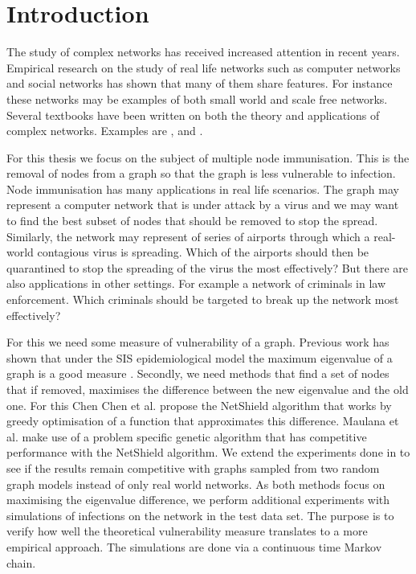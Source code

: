 \documentclass[11pt]{article}
\theoremstyle{definition}
\begin{document}
\cleardoublepage

\section{Introduction}

The study of complex networks has received increased attention in recent years. Empirical research on the study of real life networks such as computer networks and social networks has shown that many of them share features. For instance these networks may be examples of both small world and scale free networks. Several textbooks have been written on both the theory and applications of complex networks. Examples are \cite{van2016random}, \cite{Draief} and \cite{thai2011handbook}.

For this thesis we focus on the subject of multiple node immunisation. This is the removal of nodes from a graph so that the graph is less vulnerable to infection. Node immunisation has many applications in real life scenarios. The graph may represent a computer network that is under attack by a virus and we may want to find the best subset of nodes that should be removed to stop the spread. Similarly, the network may represent of series of airports through which a real-world contagious virus is spreading. Which of the airports should then be quarantined to stop the spreading of the virus the most effectively? But there are also applications in other settings. For example a network of criminals in law enforcement. Which criminals should be targeted to break up the network most effectively?

For this we need some measure of vulnerability of a graph. Previous work has shown that under the SIS epidemiological model the maximum eigenvalue of a graph is a good measure \cite{chakrabarti2008epidemic} \cite{li2013epidemic}. Secondly, we need methods that find a set of nodes that if removed, maximises the difference between the new eigenvalue and the old one. For this Chen Chen et al. \cite{chen2016node} propose the NetShield algorithm that works by greedy optimisation of a function that approximates this difference. Maulana et al. \cite{maulana2017immunization} make use of a problem specific genetic algorithm that has competitive performance with the NetShield algorithm. We extend the experiments done in \cite{maulana2017immunization} to see if the results remain competitive with graphs sampled from two random graph models instead of only real world networks. As both methods focus on maximising the eigenvalue difference, we perform additional experiments with simulations of infections on the network in the test data set. The purpose is to verify how well the theoretical vulnerability measure translates to a more empirical approach. The simulations are done via a continuous time Markov chain.
\end{document}
